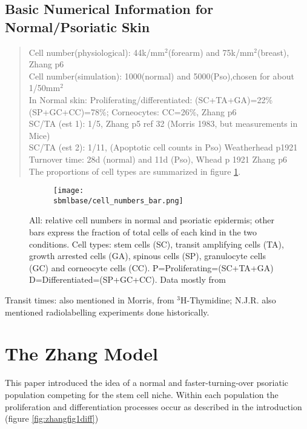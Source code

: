 \documentclass[a4paper,10pt]{report}
\newcommand{\psortbase}{/home/ngrs2/work/bsu/PSORT_Zuliani_Reynolds/}
\newcommand{\sbmlbase}{\psortbase/sbml-sh/}
\begin{document}
\section{Basic Numerical Information for Normal/Psoriatic Skin}
\begin{quote}
 
Cell number(physiological): 44k/mm$^2$(forearm) and 75k/mm$^2$(breast), Zhang p6 \\
Cell number(simulation): 1000(normal) and 5000(Pso),chosen for about 1/50mm$^2$\\
In Normal skin:
Proliferating/differentiated: (SC+TA+GA)=22\% (SP+GC+CC)=78\%; Corneocytes: CC=26\%, Zhang p6\\
SC/TA (est 1):  1/5, Zhang p5 ref 32 (Morris 1983, but measurements in Mice)\\
SC/TA (est 2): 1/11, (Apoptotic cell counts in Pso) Weatherhead p1921\\
Turnover time: 28d (normal) and 11d (Pso), Whead p 1921 Zhang p6\\
The proportions of cell types are summarized in figure \ref{fig:psoriasis_cell_numbers}.
\end{quote} 
\begin{figure}[h!]
  \begin{subfigure}{.9\textwidth}
    \centering
    \texttt{[image: \\sbmlbase/cell\_numbers\_bar.png]}
  \end{subfigure}
  \caption{All: relative cell numbers in normal and psoriatic epidermis; other bars express the fraction of total cells of each kind in the two conditions. 
Cell types:  stem cells (SC), transit amplifying cells (TA), growth arrested cells (GA), spinous cells (SP), granulocyte cells (GC) and corneocyte cells (CC). 
P=Proliferating=(SC+TA+GA) D=Differentiated=(SP+GC+CC). Data mostly from \cite{zhang2015modelling}}
  \label{fig:psoriasis_cell_numbers}
\end{figure}


Transit times: also mentioned in Morris, from $^3$H-Thymidine; N.J.R. also mentioned radiolabelling experiments done historically. 


\chapter{The Zhang Model}

This paper \cite{zhang2015modelling} introduced the idea of a normal and faster-turning-over psoriatic population competing for the stem cell niche. Within each population the proliferation and differentiation processes occur as described in the introduction (figure \ref{fig:zhangfig1diff})
\end{document}

